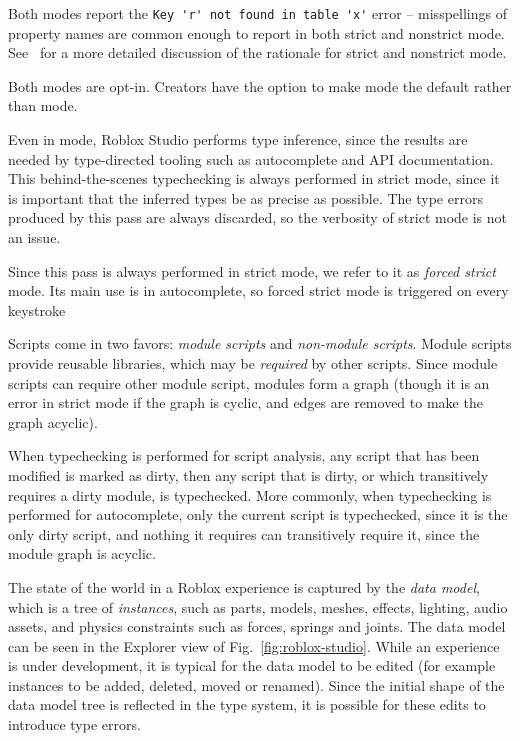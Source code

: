 \documentclass[english,submission,cleveref]{programming}
\begin{document}
Both modes report the \verb|Key 'r' not found in table 'x'| error --
misspellings of property names are common enough to report in both
strict and nonstrict mode. See~\cite{bfj-hatra-2021}
for a more detailed discussion of the rationale for strict and nonstrict mode.

Both modes are opt-in. Creators have the option to make \mnonstrict{} mode
the default rather than \mnocheck{} mode.

Even in \mnocheck{} mode, {Roblox Studio} performs type inference, since
the results are needed by type-directed tooling such as autocomplete and
API documentation. This behind-the-scenes typechecking is always performed
in strict mode, since it is important that the inferred types be as precise
as possible. The type errors produced by this pass are always discarded,
so the verbosity of strict mode is not an issue.

Since this pass is always performed in strict mode, we refer to it as
\emph{forced strict} mode. Its main use is in autocomplete, so forced
strict mode is triggered on every keystroke

Scripts come in two favors: \emph{module scripts} and \emph{non-module
scripts}.  Module scripts provide reusable libraries, which may be
\emph{required} by other scripts. Since module scripts can require
other module script, modules form a graph (though it is
an error in strict mode if the graph is cyclic, and edges are removed to
make the graph acyclic).

When typechecking is performed for script analysis, any script that
has been modified is marked as dirty, then any script that is dirty,
or which transitively requires a dirty module, is typechecked. More
commonly, when typechecking is performed for autocomplete, only
the current script is typechecked, since it is the only dirty
script, and nothing it requires can transitively require it, since
the module graph is acyclic.

The state of the world in a {Roblox} experience is captured by
the \emph{data model}, which is a tree of \emph{instances}, such as
parts, models, meshes, effects, lighting, audio assets, and physics
constraints such as forces, springs and joints.
The data model can be seen in the Explorer view of Fig.~\ref{fig:roblox-studio}.
While an experience is under development, it is typical for the data
model to be edited (for example instances to be added, deleted, moved
or renamed). Since the initial shape of the data model tree is reflected in
the type system, it is possible for these edits to introduce type errors.
\end{document}
